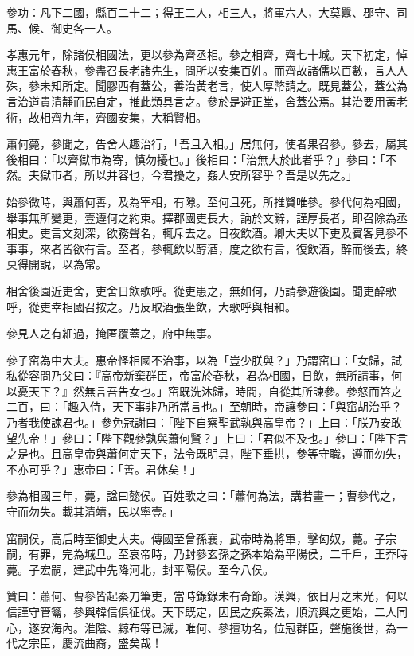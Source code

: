 \begin{pinyinscope}
參功：凡下二國，縣百二十二；得王二人，相三人，將軍六人，大莫囂、郡守、司馬、候、御史各一人。

孝惠元年，除諸侯相國法，更以參為齊丞相。參之相齊，齊七十城。天下初定，悼惠王富於春秋，參盡召長老諸先生，問所以安集百姓。而齊故諸儒以百數，言人人殊，參未知所定。聞膠西有蓋公，善治黃老言，使人厚幣請之。既見蓋公，蓋公為言治道貴清靜而民自定，推此類具言之。參於是避正堂，舍蓋公焉。其治要用黃老術，故相齊九年，齊國安集，大稱賢相。

蕭何薨，參聞之，告舍人趣治行，「吾且入相。」居無何，使者果召參。參去，屬其後相曰：「以齊獄市為寄，慎勿擾也。」後相曰：「治無大於此者乎？」參曰：「不然。夫獄市者，所以并容也，今君擾之，姦人安所容乎？吾是以先之。」

始參微時，與蕭何善，及為宰相，有隙。至何且死，所推賢唯參。參代何為相國，舉事無所變更，壹遵何之約束。擇郡國吏長大，訥於文辭，謹厚長者，即召除為丞相史。吏言文刻深，欲務聲名，輒斥去之。日夜飲酒。卿大夫以下吏及賓客見參不事事，來者皆欲有言。至者，參輒飲以醇酒，度之欲有言，復飲酒，醉而後去，終莫得開說，以為常。

相舍後園近吏舍，吏舍日飲歌呼。從吏患之，無如何，乃請參遊後園。聞吏醉歌呼，從吏幸相國召按之。乃反取酒張坐飲，大歌呼與相和。

參見人之有細過，掩匿覆蓋之，府中無事。

參子窋為中大夫。惠帝怪相國不治事，以為「豈少朕與？」乃謂窋曰：「女歸，試私從容問乃父曰：『高帝新棄群臣，帝富於春秋，君為相國，日飲，無所請事，何以憂天下？』然無言吾告女也。」窋既洗沐歸，時間，自從其所諫參。參怒而笞之二百，曰：「趣入侍，天下事非乃所當言也。」至朝時，帝讓參曰：「與窋胡治乎？乃者我使諫君也。」參免冠謝曰：「陛下自察聖武孰與高皇帝？」上曰：「朕乃安敢望先帝！」參曰：「陛下觀參孰與蕭何賢？」上曰：「君似不及也。」參曰：「陛下言之是也。且高皇帝與蕭何定天下，法令既明具，陛下垂拱，參等守職，遵而勿失，不亦可乎？」惠帝曰：「善。君休矣！」

參為相國三年，薨，諡曰懿侯。百姓歌之曰：「蕭何為法，講若畫一；曹參代之，守而勿失。載其清靖，民以寧壹。」

窋嗣侯，高后時至御史大夫。傳國至曾孫襄，武帝時為將軍，擊匈奴，薨。子宗嗣，有罪，完為城旦。至哀帝時，乃封參玄孫之孫本始為平陽侯，二千戶，王莽時薨。子宏嗣，建武中先降河北，封平陽侯。至今八侯。

贊曰：蕭何、曹參皆起秦刀筆吏，當時錄錄未有奇節。漢興，依日月之末光，何以信謹守管籥，參與韓信俱征伐。天下既定，因民之疾秦法，順流與之更始，二人同心，遂安海內。淮陰、黥布等已滅，唯何、參擅功名，位冠群臣，聲施後世，為一代之宗臣，慶流曲裔，盛矣哉！


\end{pinyinscope}